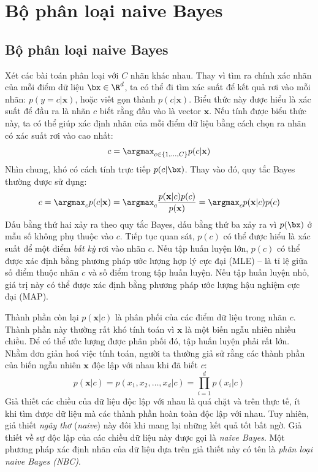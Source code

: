 \chapter{Bộ phân loại naive Bayes}
\label{cha:nbc}

\section{Bộ phân loại naive Bayes}

Xét các bài toán phân loại với $C$ nhãn khác nhau. Thay vì tìm ra chính
xác nhãn của mỗi điểm dữ liệu $\bx \in \R^d$, ta có thể đi tìm xác suất để kết quả rơi vào mỗi nhãn:
\begin{math} 
\label{eqn:32_1}
p(y = c |\mathbf{x})
\end{math},
hoặc viết gọn thành $p(c|\mathbf{x})$. Biểu thức này được hiểu là xác suất để
đầu ra là nhãn $c$ biết rằng đầu vào là vector $\mathbf{x}$. Nếu tính được biểu thức này, ta có thể giúp xác định nhãn của mỗi điểm dữ liệu bằng cách chọn ra
nhãn có xác suất rơi vào cao nhất:
\begin{equation} 
\label{eqn:32_2}
c = \argmax_{c \in \{1, \dots, C\}} p(c | \mathbf{x}) 
\end{equation} 
Nhìn chung, khó có cách tính trực tiếp $p(c|\bx)$. Thay vào đó,
quy tắc Bayes thường được sử dụng:
\begin{align} 
  c =  \argmax_c p(c | \mathbf{x}) =  
  \argmax_c \frac{p(\mathbf{x} | c) p(c)}{p(\mathbf{x})} 
  =  \argmax_c p(\mathbf{x} | c) p(c) 
\end{align} 
Dấu bằng thứ hai xảy ra theo quy tắc Bayes, dấu bằng thứ ba xảy ra vì $p(\bx)$ ở
mẫu số không phụ thuộc vào $c$. Tiếp tục quan sát, $p(c)$ có thể được hiểu là
xác suất để một điểm \textit{bất kỳ} rơi vào nhãn $c$. Nếu tập huấn luyện lớn,
$p(c)$ có thể được xác định bằng phương pháp ước lượng hợp lý cực đại (MLE) -- là
tỉ lệ giữa số điểm thuộc nhãn $c$ và số điểm trong tập huấn luyện. Nếu tập huấn
luyện nhỏ, giá trị này có thể được xác định bằng phương pháp ước lượng hậu
nghiệm cực đại (MAP).
 
Thành phần còn lại $p(\mathbf{x} | c)$ là phân phối của các điểm dữ liệu trong
nhãn $c$. Thành phần này thường rất khó tính toán vì $\mathbf{x}$ là một biến
ngẫu nhiên nhiều chiều. Để có thể ước lượng được phân phối đó, tập huấn luyện
phải rất lớn. Nhằm đơn giản hoá việc tính toán, người ta thường giả sử
rằng các thành phần của biến ngẫu nhiên $\mathbf{x}$ độc lập với nhau khi đã
biết $c$:
\begin{equation} 
\label{eqn:32_6}
p(\mathbf{x} | c) = p(x_1, x_2, \dots, x_d | c) =  \prod_{i = 1}^d p(x_i | c)
\end{equation} 
Giả thiết các chiều của dữ liệu độc lập với nhau là quá chặt và trên thực tế, ít
khi tìm được dữ liệu mà các thành phần hoàn toàn độc lập với nhau. Tuy nhiên,
giả thiết \textit{ngây thơ} (\textit{naive}) này đôi khi mang lại những kết quả
tốt bất ngờ. Giả thiết về sự độc lập của các chiều dữ liệu này được gọi là
\textit{naive Bayes}. Một phương pháp xác định nhãn của dữ liệu dựa trên giả
thiết này có tên là \textit{phân loại naive Bayes (NBC)}.
 
